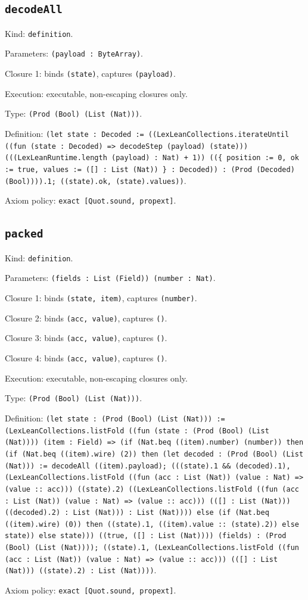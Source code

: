 \documentclass[11pt]{article}
\begin{document}
\subsection*{\texttt{decodeAll}}
\noindent Kind: \texttt{definition}.\par
\noindent Parameters: \texttt{(payload : ByteArray)}.\par
\noindent Closure 1: binds \texttt{(state)}, captures \texttt{(payload)}.\par
\noindent Execution: executable, non-escaping closures only.\par
\noindent Type: \texttt{(Prod (Bool) (List (Nat)))}.\par
\noindent Definition: \texttt{(let state : Decoded := ((LexLeanCollections.iterateUntil ((fun (state : Decoded) => decodeStep (payload) (state))) (((LexLeanRuntime.length (payload) : Nat) + 1)) ((\{ position := 0, ok := true, values := ([] : List (Nat)) \} : Decoded)) : (Prod (Decoded) (Bool)))).1; ((state).ok, (state).values))}.\par
\noindent Axiom policy: \texttt{exact [Quot.sound, propext]}.\par
\subsection*{\texttt{packed}}
\noindent Kind: \texttt{definition}.\par
\noindent Parameters: \texttt{(fields : List (Field)) (number : Nat)}.\par
\noindent Closure 1: binds \texttt{(state, item)}, captures \texttt{(number)}.\par
\noindent Closure 2: binds \texttt{(acc, value)}, captures \texttt{()}.\par
\noindent Closure 3: binds \texttt{(acc, value)}, captures \texttt{()}.\par
\noindent Closure 4: binds \texttt{(acc, value)}, captures \texttt{()}.\par
\noindent Execution: executable, non-escaping closures only.\par
\noindent Type: \texttt{(Prod (Bool) (List (Nat)))}.\par
\noindent Definition: \texttt{(let state : (Prod (Bool) (List (Nat))) := (LexLeanCollections.listFold ((fun (state : (Prod (Bool) (List (Nat)))) (item : Field) => (if (Nat.beq ((item).number) (number)) then (if (Nat.beq ((item).wire) (2)) then (let decoded : (Prod (Bool) (List (Nat))) := decodeAll ((item).payload); (((state).1 \&\& (decoded).1), (LexLeanCollections.listFold ((fun (acc : List (Nat)) (value : Nat) => (value :: acc))) ((state).2) ((LexLeanCollections.listFold ((fun (acc : List (Nat)) (value : Nat) => (value :: acc))) (([] : List (Nat))) ((decoded).2) : List (Nat))) : List (Nat)))) else (if (Nat.beq ((item).wire) (0)) then ((state).1, ((item).value :: (state).2)) else state)) else state))) ((true, ([] : List (Nat)))) (fields) : (Prod (Bool) (List (Nat)))); ((state).1, (LexLeanCollections.listFold ((fun (acc : List (Nat)) (value : Nat) => (value :: acc))) (([] : List (Nat))) ((state).2) : List (Nat))))}.\par
\noindent Axiom policy: \texttt{exact [Quot.sound, propext]}.\par
\end{document}

